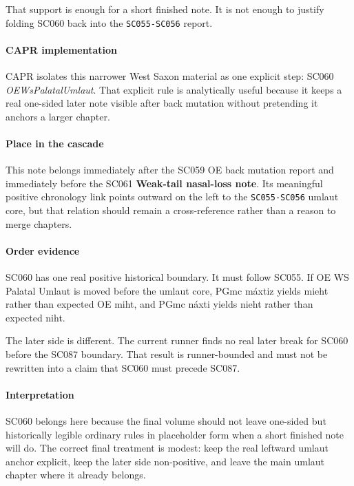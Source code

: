\documentclass[
  british,
  a4paper,
]{article}
\begin{document}
That support is enough for a short finished note. It is not enough to
justify folding SC060 back into the \texttt{SC055-SC056} report.

\paragraph{CAPR implementation}\label{capr-implementation-38}

CAPR isolates this narrower West Saxon material as one explicit step:
SC060 \emph{OEWsPalatalUmlaut}. That explicit rule is analytically
useful because it keeps a real one-sided later note visible after back
mutation without pretending it anchors a larger chapter.

\paragraph{Place in the cascade}\label{place-in-the-cascade-38}

This note belongs immediately after the SC059 OE back mutation report
and immediately before the SC061 \textbf{Weak-tail nasal-loss note}. Its
meaningful positive chronology link points outward on the left to the
\texttt{SC055-SC056} umlaut core, but that relation should remain a
cross-reference rather than a reason to merge chapters.

\paragraph{Order evidence}\label{order-evidence-38}

SC060 has one real positive historical boundary. It must follow SC055.
If OE WS Palatal Umlaut is moved before the umlaut core, PGmc máxtiz
yields mieht rather than expected OE miht, and PGmc náxti yields nieht
rather than expected niht.

The later side is different. The current runner finds no real later
break for SC060 before the SC087 boundary. That result is runner-bounded
and must not be rewritten into a claim that SC060 must precede SC087.

\paragraph{Interpretation}\label{interpretation-38}

SC060 belongs here because the final volume should not leave one-sided
but historically legible ordinary rules in placeholder form when a short
finished note will do. The correct final treatment is modest: keep the
real leftward umlaut anchor explicit, keep the later side non-positive,
and leave the main umlaut chapter where it already belongs.
\end{document}

